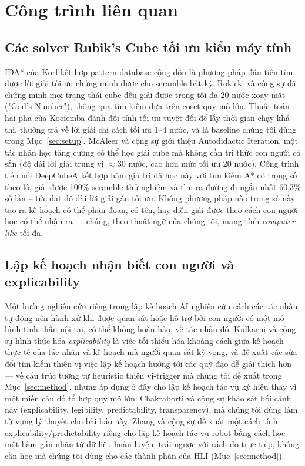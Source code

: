 \documentclass[10pt,conference]{article}
\begin{document}
\section{Công trình liên quan}
\label{sec:related}

\subsection{Các solver Rubik's Cube tối ưu kiểu máy tính}
\label{sec:related-optimal}
IDA* của Korf kết hợp pattern database cộng dồn \citep{korf1997} là
phương pháp đầu tiên tìm được lời giải tối ưu chứng minh được cho scramble
bất kỳ. Rokicki và cộng sự \citep{rokicki2014} đã chứng minh mọi trạng
thái cube đều giải được trong tối đa 20 nước xoay mặt ("God's Number"),
thông qua tìm kiếm dựa trên coset quy mô lớn. Thuật toán hai pha của
Kociemba \citep{kociemba} đánh đổi tính tối ưu tuyệt đối để lấy thời
gian chạy khả thi, thường trả về lời giải chỉ cách tối ưu 1--4 nước, và
là baseline chúng tôi dùng trong Mục~\ref{sec:setup}. McAleer và cộng
sự \citep{mcaleer2018} giới thiệu Autodidactic Iteration, một tác nhân
học tăng cường có thể học giải cube mà không cần tri thức con người có
sẵn (độ dài lời giải trung vị $\approx$30 nước, cao hơn mức tối ưu 20
nước). Công trình tiếp nối DeepCubeA \citep{agostinelli2019} kết hợp
hàm giá trị đã học này với tìm kiếm A* có trọng số theo lô, giải được
100\% scramble thử nghiệm và tìm ra đường đi ngắn nhất 60,3\% số lần
-- tức đạt độ dài lời giải gần tối ưu. Không phương pháp nào trong số này tạo ra kế hoạch
có thể phân đoạn, có tên, hay diễn giải được theo cách con người học có
thể nhận ra — chúng, theo thuật ngữ của chúng tôi, mang tính
\emph{computer-like} tối đa.

\subsection{Lập kế hoạch nhận biết con người và explicability}
\label{sec:related-explicability}
Một hướng nghiên cứu riêng trong lập kế hoạch AI nghiên cứu cách các
tác nhân tự động nên hành xử khi được quan sát hoặc hỗ trợ bởi con
người có một mô hình tinh thần nội tại, có thể không hoàn hảo, về tác
nhân đó. Kulkarni và cộng sự \citep{kulkarni2016} hình thức hóa
\emph{explicability} là việc tối thiểu hóa khoảng cách giữa kế hoạch
thực tế của tác nhân và kế hoạch mà người quan sát kỳ vọng, và đề xuất
các sửa đổi tìm kiếm thiên vị việc lập kế hoạch hướng tới các quỹ đạo
dễ giải thích hơn — về cấu trúc tương tự heuristic thiên vị-trigger mà
chúng tôi đề xuất trong Mục~\ref{sec:method}, nhưng áp dụng ở đây cho
lập kế hoạch tác vụ ký hiệu thay vì một miền câu đố tổ hợp quy mô lớn.
Chakraborti và cộng sự \citep{chakraborti2019} khảo sát bối cảnh này
(explicability, legibility, predictability, transparency), mà chúng
tôi dùng làm từ vựng lý thuyết cho bài báo này. Zhang và cộng sự
\citep{zhang2017} đề xuất một cách tính explicability/predictability
riêng cho lập kế hoạch tác vụ robot bằng cách học một hàm gán nhãn từ
dữ liệu huấn luyện, trái ngược với cách đo trực tiếp, không cần học
mà chúng tôi dùng cho các thành phần của HLI (Mục~\ref{sec:method}).
\end{document}
